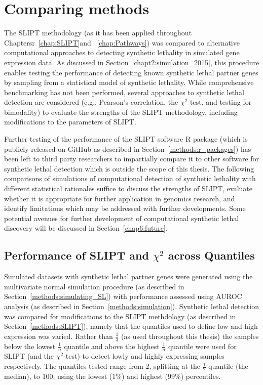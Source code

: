 \section{Comparing methods} \label{chap5:compare_ methods}

The \gls{SLIPT} methodology (as it has been applied throughout Chaptersr~\ref{chap:SLIPT}and ~\ref{chap:Pathways}) was compared to alternative computational approaches to detecting synthetic lethality in simulated gene expression data. As discussed in Section~\ref{chapt2:simulation_2015}, this procedure enables testing the performance of detecting known synthetic lethal partner genes by sampling from a statistical model of synthetic lethality. While comprehensive benchmarking has not been performed, several approaches to synthetic lethal detection are considered (e.g., Pearson's correlation, the $\chi^2$ test, and testing for bimodality) to evaluate the strengths of the SLIPT methodology, including modifications to the parameters of \gls{SLIPT}.

Further testing of the performance of the SLIPT software R package (which is publicly released on GitHub as described in Section~\ref{methods:r_packages}) has been left to third party researchers to impartially compare it to other software for synthetic lethal detection which is outside the scope of this thesis. The following comparisons of simulations of computational detection of synthetic lethality with different statistical rationales suffice to discuss the strengths of \gls{SLIPT}, evaluate whether it is appropriate for further application in genomics research, and identify limitations which may be addressed with further developments. Some potential avenues for further development of computational synthetic lethal discovery will be discussed in Section~\ref{chap6:future}.

\subsection{Performance of SLIPT and $\chi^2$ across Quantiles}
\label{chap5:compare_chisq}

Simulated datasets with synthetic lethal partner genes were generated using the multivariate normal simulation procedure (as described in Section~\ref{methods:simulating_SL}) with performance assessed using \gls{AUROC} analysis (as described in Section~\ref{methods:simulation}). Synthetic lethal detection was compared for modifications to the \gls{SLIPT} methdology (as described in Section~\ref{methods:SLIPT}), namely that the quantiles used to define low and high expression was varied. Rather than $\frac{1}{3}$ (as used throughout this thesis) the samples below the lowest $\frac{1}{n}$ quantile and above the highest $\frac{1}{n}$ quantile were used for \gls{SLIPT} (and the $\chi^2$-test) to detect lowly and highly expressing samples respectively. The quantiles tested range from 2, splitting at the $\frac{1}{2}$ quantile (the median), to 100, using the lowest (1\%) and highest (99\%) percentiles.

